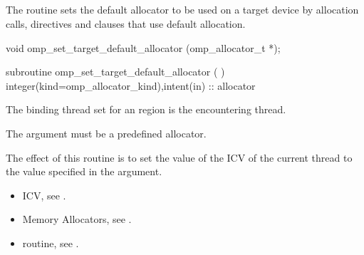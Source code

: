 \ccppspecificstart

\subsection{}
\label{subsec:omp_set_target_default_allocator}

\summary
The  routine sets the default allocator to be used on a target device by allocation calls, directives and clauses that use default allocation.

\format
\ccppspecificstart
\begin{boxedcode}
void omp_set_target_default_allocator (omp_allocator_t *);
\end{boxedcode}
\ccppspecificend
\fortranspecificstart
\begin{boxedcode}
subroutine omp_set_target_default_allocator (  )
integer(kind=omp_allocator_kind),intent(in) :: allocator
\end{boxedcode}
\fortranspecificend
\binding
The binding thread set for an  region is the encountering thread.

\constraints

The  argument must be a predefined allocator.

\effect

The effect of this routine is to set the value of the  ICV of the current thread to the value specified in the  argument. 

\crossreferences

\begin{itemize}
\item {} ICV, see .
\item Memory Allocators, see .
\item {} routine, see .
\end{itemize}

\subsection{}
\label{subsec:omp_get_target_default_allocator}


